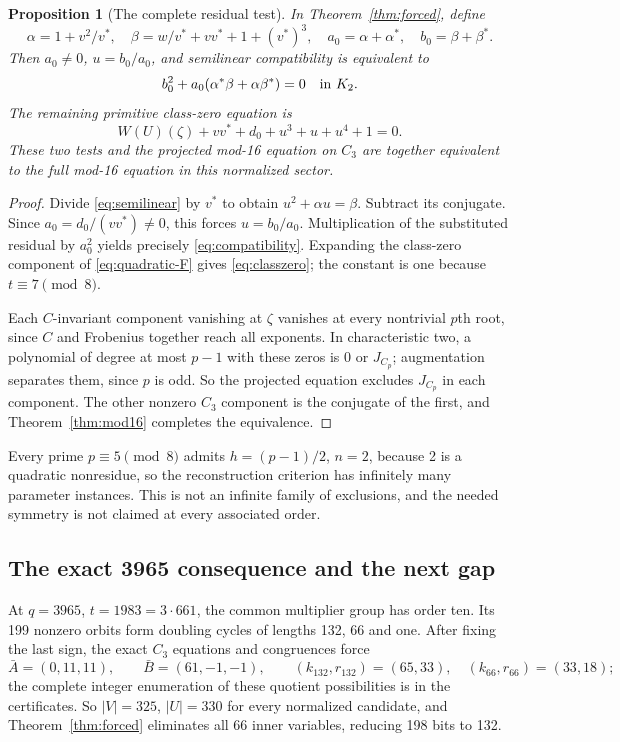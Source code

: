\documentclass[11pt]{article}
\newtheorem{proposition}[theorem]{Proposition}
\theoremstyle{definition}
\theoremstyle{remark}
\begin{document}
\begin{proposition}[The complete residual test]\label{prop:residual}
In Theorem~\ref{thm:forced}, define
\[
 \alpha=1+v^2/v^*,\quad
 \beta=w/v^*+vv^*+1+(v^*)^3,\quad
 a_0=\alpha+\alpha^*,\quad b_0=\beta+\beta^*.
\]
Then $a_0\ne0$, $u=b_0/a_0$, and semilinear compatibility is equivalent to
\begin{equation}\label{eq:compatibility}
 b_0^2+a_0(\alpha^*\beta+\alpha\beta^*)=0\quad\hbox{in }K_2.
\end{equation}
The remaining primitive class-zero equation is
\begin{equation}\label{eq:classzero}
 W(U)(\zeta)+vv^*+d_0+u^3+u+u^4+1=0.
\end{equation}
These two tests and the projected mod-16 equation on $C_3$ are together
equivalent to the full mod-16 equation in this normalized sector.
\end{proposition}
\begin{proof}
Divide \eqref{eq:semilinear} by $v^*$ to obtain
$u^2+\alpha u=\beta$. Subtract its conjugate. Since
$a_0=d_0/(vv^*)\ne0$, this forces $u=b_0/a_0$.
Multiplication of the substituted residual by $a_0^2$ yields precisely
\eqref{eq:compatibility}. Expanding the class-zero component of
\eqref{eq:quadratic-F} gives \eqref{eq:classzero}; the constant is one
because $t\equiv7\pmod8$.

Each $C$-invariant component vanishing at $\zeta$ vanishes at every
nontrivial $p$th root, since $C$ and Frobenius together reach all
exponents. In characteristic two, a polynomial of degree at most $p-1$
with these zeros is $0$ or $J_{C_p}$; augmentation separates them, since
$p$ is odd. So the projected equation excludes $J_{C_p}$ in each
component. The other nonzero $C_3$ component is the conjugate of the
first, and Theorem~\ref{thm:mod16} completes the equivalence.
\end{proof}
Every prime $p\equiv5\pmod8$ admits $h=(p-1)/2$, $n=2$, because 2 is a
quadratic nonresidue, so the reconstruction criterion has infinitely many
parameter instances. This is not an infinite family of exclusions, and the
needed symmetry is not claimed at every associated order.

\subsection{The exact 3965 consequence and the next gap}
At $q=3965$, $t=1983=3\cdot661$, the common multiplier group has order ten.
Its 199 nonzero orbits form doubling cycles of lengths 132, 66 and one.
After fixing the last sign, the exact $C_3$ equations and congruences force
\[
 \bar A=(0,11,11),\qquad\bar B=(61,-1,-1),\qquad
 (k_{132},r_{132})=(65,33),\quad(k_{66},r_{66})=(33,18);
\]
the complete integer enumeration of these quotient possibilities is in the
certificates. So $|V|=325$, $|U|=330$ for every normalized candidate, and
Theorem~\ref{thm:forced} eliminates all 66 inner variables, reducing 198
bits to 132.
\end{document}
